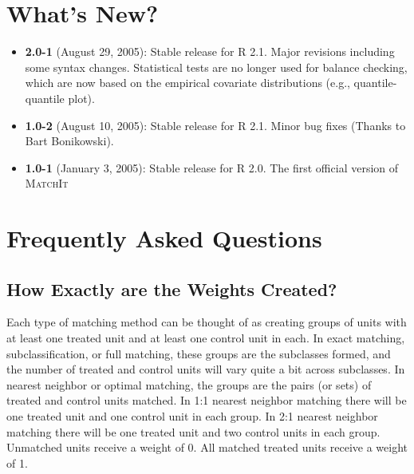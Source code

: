 \documentclass[oneside,letterpaper,titlepage]{article}
\newcommand{\MatchIt}{\textsc{MatchIt}}
\begin{document}

\section{What's New?}

\begin{itemize}
\item \textbf{2.0-1} (August 29, 2005): Stable release for R 2.1.
  Major revisions including some syntax changes. Statistical tests are
  no longer used for balance checking, which are now based on the
  empirical covariate distributions (e.g., quantile-quantile plot).
\item \textbf{1.0-2} (August 10, 2005): Stable release for R
  2.1. Minor bug fixes (Thanks to Bart Bonikowski).
\item \textbf{1.0-1} (January 3, 2005): Stable release for R 2.0. The
  first official version of \MatchIt
\end{itemize}




\section{Frequently Asked Questions}

%

\subsection{How Exactly are the Weights Created?}
\label{subsec:weights}

Each type of matching method can be thought of as creating groups of
units with at least one treated unit and at least one control unit in
each.  In exact matching, subclassification, or full matching, these
groups are the subclasses formed, and the number of treated and
control units will vary quite a bit across subclasses.  In nearest
neighbor or optimal matching, the groups are the pairs (or sets) of
treated and control units matched.  In 1:1 nearest neighbor matching
there will be one treated unit and one control unit in each group.  In
2:1 nearest neighbor matching there will be one treated unit and two
control units in each group.  Unmatched units receive a weight of 0.
All matched treated units receive a weight of 1.
\end{document}
